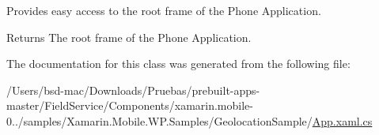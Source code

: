 Provides easy access to the root frame of the Phone Application. 

\begin{DoxyReturn}{Returns}
The root frame of the Phone Application.
\end{DoxyReturn}


The documentation for this class was generated from the following file\+:\begin{DoxyCompactItemize}
\item 
/\+Users/bsd-\/mac/\+Downloads/\+Pruebas/prebuilt-\/apps-\/master/\+Field\+Service/\+Components/xamarin.\+mobile-\/0../samples/\+Xamarin.\+Mobile.\+W\+P.\+Samples/\+Geolocation\+Sample/\hyperlink{_components_2xamarin_8mobile-0_86_81_2samples_2_xamarin_8_mobile_8_w_p_8_samples_2_geolocation_sample_2_app_8xaml_8cs}{App.\+xaml.\+cs}\end{DoxyCompactItemize}
